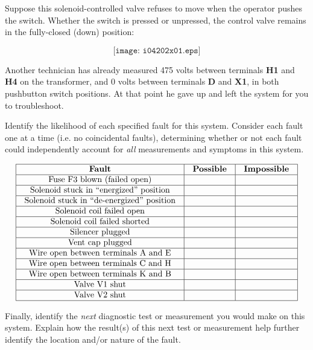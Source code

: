 

Suppose this solenoid-controlled valve refuses to move when the operator pushes the switch.  Whether the switch is pressed or unpressed, the control valve remains in the fully-closed (down) position:

$$\texttt{[image: i04202x01.eps]}$$

Another technician has already measured 475 volts between terminals {\bf H1} and {\bf H4} on the transformer, and 0 volts between terminals {\bf D} and {\bf X1}, in both pushbutton switch positions.  At that point he gave up and left the system for you to troubleshoot.

Identify the likelihood of each specified fault for this system.  Consider each fault one at a time (i.e. no coincidental faults), determining whether or not each fault could independently account for {\it all} measurements and symptoms in this system.


$$\vbox{\offinterlineskip
\halign{\strut
\vrule \quad\hfil # \ \hfil & 
\vrule \quad\hfil # \ \hfil & 
\vrule \quad\hfil # \ \hfil \vrule \cr
\noalign{\hrule}
%
{\bf Fault} & {\bf Possible} & {\bf Impossible} \cr
%
\noalign{\hrule}
%
Fuse F3 blown (failed open) &  &  \cr
%
\noalign{\hrule}
%
Solenoid stuck in ``energized'' position &  &  \cr
%
\noalign{\hrule}
%
Solenoid stuck in ``de-energized'' position &  &  \cr
%
\noalign{\hrule}
%
Solenoid coil failed open &  &  \cr
%
\noalign{\hrule}
%
Solenoid coil failed shorted &  &  \cr
%
\noalign{\hrule}
%
Silencer plugged &  &  \cr
%
\noalign{\hrule}
%
Vent cap plugged &  &  \cr
%
\noalign{\hrule}
%
Wire open between terminals A and E &  &  \cr
%
\noalign{\hrule}
%
Wire open between terminals C and H &  &  \cr
%
\noalign{\hrule}
%
Wire open between terminals K and B &  &  \cr
%
\noalign{\hrule}
%
Valve V1 shut &  &  \cr
%
\noalign{\hrule}
%
Valve V2 shut &  &  \cr
%
\noalign{\hrule}
} %
}$$ %

Finally, identify the {\it next} diagnostic test or measurement you would make on this system.  Explain how the result(s) of this next test or measurement help further identify the location and/or nature of the fault.

